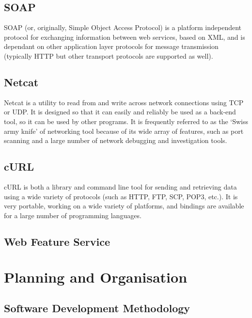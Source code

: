\documentclass[a4paper, 12pt, twoside]{article}
\begin{document}
\subsection{SOAP}
\label{sec:bg_soap}

SOAP (or, originally, Simple Object Access Protocol) is a platform independent protocol for exchanging information between web services, based on XML, and is dependant on other application layer protocols for message transmission (typically HTTP but other transport protocols are supported as well).

\subsection{Netcat}
\label{sec:bg_netcat}

Netcat is a utility to read from and write across network connections using TCP or UDP. It is designed so that it can easily and reliably be used as a back-end tool, so it can be used by other programs. It is frequently referred to as the `Swiss army knife' of networking tool because of its wide array of features, such as port scanning and a large number of network debugging and investigation tools.

\subsection{cURL}
\label{sec:bg_curl}

cURL is both a library and command line tool for sending and retrieving data using a wide variety of protocols (such as HTTP, FTP, SCP, POP3, etc.). It is very portable, working on a wide variety of platforms, and bindings are available for a large number of programming languages.

\subsection{Web Feature Service}
\label{sec:bg_wfs}

\newpage

\section{Planning and Organisation}
\label{sec:planning}

\subsection{Software Development Methodology}
\label{sec:plan_software_development_methodology}
\end{document}
